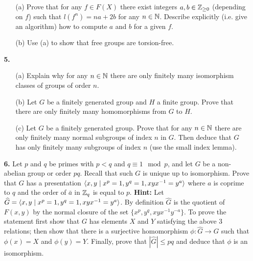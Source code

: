 \documentclass[12pt]{amsart}
\begin{document}
\begin{itemize}
\item[(a)] Prove that for any $f\in F(X)$ there exist integers $a,b\in{\mathbb Z}_{\geq 0}$
(depending on $f$) such that $l(f^n)=na+2b$ for any $n\in{\mathbb N}$.
Describe explicitly (i.e. give an algorithm) how to compute $a$ and $b$
for a given $f$.

\item[(b)] Use (a) to show that free groups are torsion-free.
\end{itemize}
{\bf 5.} 
\begin{itemize}
\item[(a)] Explain why for any $n\in{\mathbb N}$ there are only finitely many isomorphism
classes of groups of order $n$.

\item[(b)] Let $G$ be a finitely generated group and $H$ a finite group. Prove that
there are only finitely many homomorphisms from $G$ to $H$. 

\item[(c)] Let $G$ be a finitely generated group. Prove that for any $n\in{\mathbb N}$
there are only finitely many normal subgroups of index $n$ in $G$. Then deduce that
$G$ has only finitely many subgroups of index $n$ (use the small index lemma).
\end{itemize}
{\bf 6.} Let $p$ and $q$ be primes with $p<q$ and $q\equiv 1\mod p$, and let $G$ be a non-abelian group or order $pq$. Recall that such $G$ is unique up to isomorphism. Prove that $G$ has a presentation ${\langle} x,y\mid x^p=1, y^q=1, xyx^{-1}=y^a {\rangle}$ where $a$ is coprime to $q$ and the order of $\bar a$ in ${\mathbb Z}_q$ is equal to $p$.
\skv
{\bf Hint:} Let $\widehat G={\langle} x,y\mid x^p=1, y^q=1, xyx^{-1}=y^a {\rangle}$. By definition $\widehat G$ is the quotient of $F(x,y)$ by the normal closure of the set $\{x^p, y^q, xyx^{-1}y^{-a}\}$. To prove the statement first show that $G$ has elements $X$ and $Y$ satisfying the above 3 relations; then show that there is a surjective homomorphism $\phi:\widehat G\to G$ such that $\phi(x)=X$
and $\phi(y)=Y$. Finally, prove that $|\widehat G|\leq pq$ and deduce that $\phi$ is an isomorphism.
\end{document}
